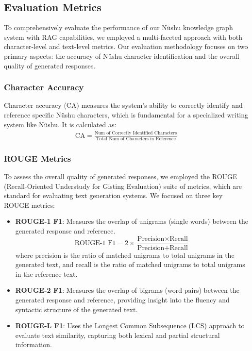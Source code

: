 \documentclass{article}
\begin{document}
\subsection{Evaluation Metrics}
\label{ssec:eval_metrics}

To comprehensively evaluate the performance of our N\"{u}shu knowledge graph system with RAG capabilities, we employed a multi-faceted approach with both character-level and text-level metrics. Our evaluation methodology focuses on two primary aspects: the accuracy of N\"{u}shu character identification and the overall quality of generated responses.

\subsubsection{Character Accuracy}
Character accuracy (CA) measures the system's ability to correctly identify and reference specific N\"{u}shu characters, which is fundamental for a specialized writing system like N\"{u}shu. It is calculated as:
\begin{multline}
\text{CA} = \frac{\text{Num of Correctly Identified Characters}}{\text{Total Num of Characters in Reference}}
\end{multline}

\subsubsection{ROUGE Metrics}
To assess the overall quality of generated responses, we employed the ROUGE (Recall-Oriented Understudy for Gisting Evaluation) suite of metrics, which are standard for evaluating text generation systems. We focused on three key ROUGE metrics:

\begin{itemize}
  \item \textbf{ROUGE-1 F1}: Measures the overlap of unigrams (single words) between the generated response and reference.
  \begin{equation}
  \text{ROUGE-1 F1} = 2 \times \frac{\text{Precision} \times \text{Recall}}{\text{Precision} + \text{Recall}}
  \end{equation}
  where precision is the ratio of matched unigrams to total unigrams in the generated text, and recall is the ratio of matched unigrams to total unigrams in the reference text.
  
  \item \textbf{ROUGE-2 F1}: Measures the overlap of bigrams (word pairs) between the generated response and reference, providing insight into the fluency and syntactic structure of the generated text.
  
  \item \textbf{ROUGE-L F1}: Uses the Longest Common Subsequence (LCS) approach to evaluate text similarity, capturing both lexical and partial structural information.
\end{itemize}
\end{document}
